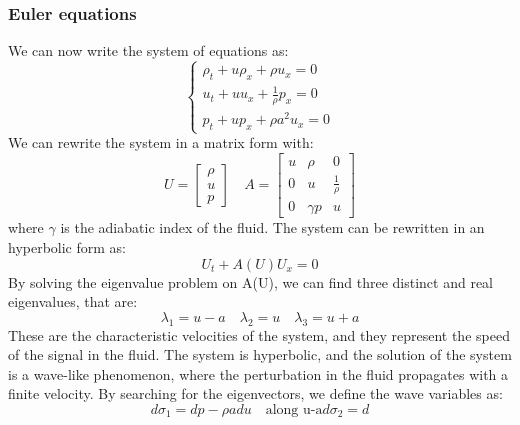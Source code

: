 \documentclass{report}
\begin{document}
\subsubsection*{Euler equations}
We can now write the system of equations as:
\begin{equation*}
    \begin{cases}
        \rho_t + u\rho_x + \rho u_x = 0     \\
        u_t + u u_x + \frac{1}{\rho}p_x = 0 \\
        p_t + u p_x + \rho a^2  u_x = 0
    \end{cases}
\end{equation*}
We can rewrite the system in a matrix form with:
\begin{equation*}
    U =
    \begin{bmatrix}
        \rho \\
        u    \\
        p
    \end{bmatrix}
    \quad
    A =
    \begin{bmatrix}
        u & \rho     & 0              \\
        0 & u        & \frac{1}{\rho} \\
        0 & \gamma p & u
    \end{bmatrix}
\end{equation*}
where $\gamma$ is the adiabatic index of the fluid. The system can be rewritten in an hyperbolic form as:
\begin{equation*}
    U_t + A(U)U_x = 0
\end{equation*}
By solving the eigenvalue problem on A(U), we can find three distinct and real eigenvalues, that are:
\begin{equation*}
    \lambda_1 = u - a \quad \lambda_2 = u \quad \lambda_3 = u + a
\end{equation*}
These are the characteristic velocities of the system, and they represent the speed of the signal in the fluid. The system is hyperbolic, and the solution of the system is a wave-like phenomenon, where the perturbation in the fluid propagates with a finite velocity.
By searching for the eigenvectors, we define the wave variables as:
\begin{equation*}
    d\sigma_1 = dp - \rho a du \quad \textrm{along u-a}
    d\sigma_2  = d
\end{equation*}
\end{document}
